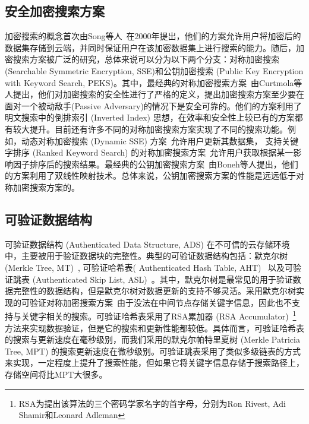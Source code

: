 \subsection{安全加密搜索方案}
加密搜索的概念首次由Song等人~\cite{song2000practical}在2000年提出，他们的方案允许用户将加密后的数据集存储到云端，并同时保证用户在该加密数据集上进行搜索的能力。随后，加密搜索方案被广泛的研究，总体来说可以分为以下两个分支：对称加密搜索 (Searchable Symmetric Encryption, SSE)和公钥加密搜索 (Public Key Encryption with Keyword Search, PEKS)。其中，最经典的对称加密搜索方案~\cite{curtmola2011searchable}由Curtmola等人提出，他们对加密搜索的安全性进行了严格的定义，提出加密搜索方案至少要在面对一个被动敌手(Passive Adversary)的情况下是安全可靠的。他们的方案利用了明文搜索中的倒排索引 (Inverted Index) 思想，在效率和安全性上较已有的方案都有较大提升。目前还有许多不同的对称加密搜索方案实现了不同的搜索功能。例如，动态对称加密搜索 (Dynamic SSE) 方案~\cite{kamara2012dynamic,cash2014dynamic,stefanov2014practical}允许用户更新其数据集， 支持关键字排序 (Ranked Keyword Search) 的对称加密搜索方案~\cite{wang2010secure}允许用户获取根据某一影响因子排序后的搜索结果。最经典的公钥加密搜索方案~\cite{boneh2004public}由Boneh等人提出，他们的方案利用了双线性映射技术。总体来说，公钥加密搜索方案的性能是远远低于对称加密搜索方案的。


\subsection{可验证数据结构}
可验证数据结构 (Authenticated Data Structure, ADS) 在不可信的云存储环境中，主要被用于验证数据块的完整性。典型的可验证数据结构包括：默克尔树 (Merkle Tree, MT)~\cite{merkle1987digital}, 可验证哈希表( Authenticated Hash Table, AHT)~\cite{papamanthou2008authenticated} 以及可验证跳表 (Authenticated Skip List, ASL)~\cite{pugh1990skip,goodrich2001implementation}。其中，默克尔树是最常见的用于验证数据完整性的数据结构，但是默克尔树对数据更新的支持不够灵活。采用默克尔树实现的可验证对称加密搜索方案~\cite{kamara2011cs2}由于没法在中间节点存储关键字信息，因此也不支持与关键字相关的搜索。可验证哈希表采用了RSA累加器 (RSA Accumulator)~\footnote{RSA为提出该算法的三个密码学家名字的首字母，分别为Ron Rivest, Adi Shamir和Leonard Adleman}  方法来实现数据验证，但是它的搜索和更新性能都较低。具体而言，可验证哈希表的搜索与更新速度在毫秒级别，而我们采用的默克尔帕特里夏树 (Merkle Patricia Tree, MPT) 的搜索更新速度在微秒级别。可验证跳表采用了类似多级链表的方式来实现，一定程度上提升了搜索性能，但如果它将关键字信息存储于搜索路径上，存储空间将比MPT大很多。


